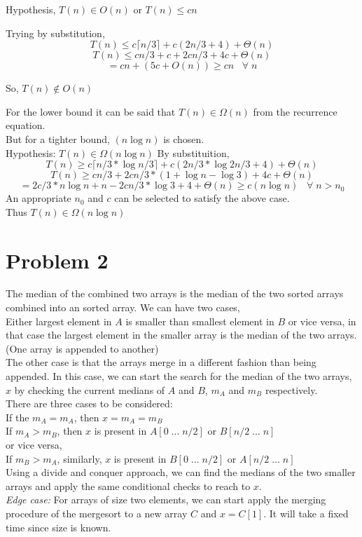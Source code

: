 \documentclass[12pt,letterpaper]{article}
\begin{document}
  Hypothesis, $T(n) \in O(n)$ or $T(n) \leq cn$
  
  Trying by substitution,
  $$T(n) \leq c\lceil n/3\rceil + c(2n/3+4) + \Theta (n)$$
  $$T(n) \leq cn/3 + c + 2cn/3 +4c +\Theta (n)$$
  $$= cn + (5c+O(n)) \geq cn \;\;\; \forall \; n$$
  
  So, $T(n) \not\in O(n)$
  
  For the lower bound it can be said that $T(n) \in \Omega (n)$ from the recurrence equation.\\
  But for a tighter bound, $(n\log n)$ is chosen.\\
  Hypothesis: $T(n) \in \Omega (n\log n)$
  By substituition,
  $$T(n) \geq c\lceil n/3*\log {n/3}\rceil + c(2n/3*\log {2n/3}+4) + \Theta (n)$$
  $$T(n) \geq cn/3 + 2cn/3*(1+\log n - \log 3) +4c +\Theta (n)$$
  $$= 2c/3*n\log n + n - 2cn/3*\log 3+ 4  + \Theta (n) \geq c(n\log n) \;\;\; \forall \; n > n_0$$
  An appropriate $n_0$ and $c$ can be selected to satisfy the above case.\\
  Thus $T(n) \in \Omega (n\log n)$
  
\section*{Problem 2}
  The median of the combined two arrays is the median of the two sorted arrays combined into an sorted array. 
  We can have two cases,\\
  Either largest element in $A$ is smaller than smallest element in $B$ or vice versa, in that case the largest element in the smaller array is the median of the two arrays. (One array is appended to another)\\
  The other case is that the arrays merge in a different fashion than being appended. In this case, we can start the search for the median of the two arrays, $x$ by checking the current medians of $A$ and $B$, $m_A$ and $m_B$ respectively.\\
  There are three cases to be considered:\\
  If the $m_A = m_A$, then $x = m_A = m_B$\\
  If $m_A > m_B$, then $x$ is present in $A[0\; ...\;n/2]$ or $B[n/2\; ...\; n]$\\
  or vice versa,\\
  If $m_B > m_A$, similarly, $x$ is present in $B[0\; ...\;n/2]$ or $A[n/2\; ...\; n]$\\
  Using a divide and conquer approach, we can find the medians of the two  smaller arrays and apply the same conditional checks to reach to $x$.\\
  \textit{Edge case:} For arrays of size two elements, we can start apply the merging procedure of the mergesort to a new array $C$ and $x=C[1]$. It will take a fixed time since size is known.
  
\end{document}
